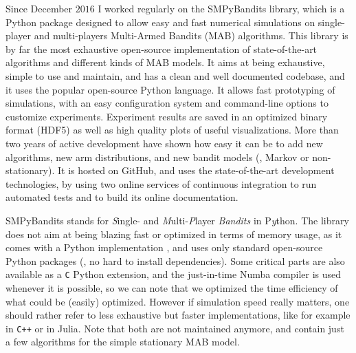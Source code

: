 Since December $2016$ I worked regularly on the SMPyBandits library, which is a Python package  designed to allow easy and fast numerical simulations on single-player and multi-players Multi-Armed Bandits (MAB) algorithms.
%
This library is by far the most exhaustive open-source implementation of state-of-the-art algorithms and different kinds of MAB models.
It aims at being exhaustive, simple to use and maintain, and has a clean and well documented codebase, and it uses the popular open-source Python language.
It allows fast prototyping of simulations, with an easy configuration system and command-line options to customize experiments.
Experiment results are saved in an optimized binary format (HDF5) as well as high quality plots of useful visualizations.
%
More than two years of active development have shown how easy it can be to add new algorithms, new arm distributions, and new bandit models (\eg, Markov or non-stationary).
It is hosted on GitHub, and uses the state-of-the-art development technologies, by using two online services of continuous integration to run automated tests and to build its online documentation.

SMPyBandits stands for \emph{S}ingle- and \emph{M}ulti-\emph{P}layer \emph{Bandits} in P\emph{y}thon.
The library does not aim at being blazing fast or optimized in terms of memory usage, as it comes with a Python implementation \cite{python}, and uses only standard open-source Python packages (\ie, no hard to install dependencies).
Some critical parts are also available as a \texttt{C} Python extension, and the just-in-time Numba compiler \cite{numba} is used whenever it is possible, so we can note that we optimized the time efficiency of what could be (easily) optimized.
However if simulation speed really matters, one should rather refer to less exhaustive but faster implementations, like for example \cite{TorLibbandit} in \texttt{C++} or \cite{VishMABjl} in Julia. Note that both are not maintained anymore, and contain just a few algorithms for the simple stationary MAB model.

